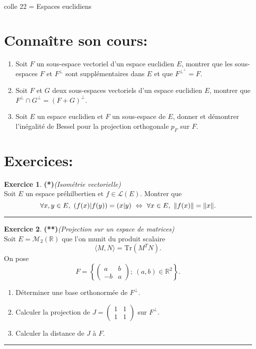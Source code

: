 \documentclass[a4paper,11pt]{article}
\theoremstyle{definition}
\newtheorem{exo}{Exercice} %
\begin{document}
	
	
	\begin{center}
		\Large \sc colle 22 = Espaces euclidiens
	\end{center}
\raggedright


\section*{Connaître son cours:}
\begin{enumerate}
\item Soit $F$ un sous-espace vectoriel d’un espace euclidien $E$, montrer que les sous-espaces $F$ et $F^\perp$ sont supplémentaires dans $E$ et que $F^{\perp^\perp} = F$.
\item Soit $F$ et $G$ deux sous-espaces vectoriels d’un espace euclidien $E$, montrer que $F^\perp  \cap G^\perp = (F + G)^\perp$.
\item Soit $E$ un espace euclidien et $F$ un sous-espace de $E$, donner et démontrer l'inégalité de Bessel pour la projection orthogonale $p_F$ sur $F$.
\end{enumerate}

\section*{Exercices:} 	

	
\begin{exo}\textbf{(*)}\quad\textit{(Isométrie vectorielle)}\\[0.25cm]

	Soit $E$ un espace préhilbertien et $f \in \mathcal{L}(E)$. Montrer que
	$$\forall x, y \in E, \ \left(f (x) | f (y)\right) = (x | y) \ \Leftrightarrow\ \forall x \in E, \ \|f (x)\| = \|x\|.$$
	\centering
	\rule{1\linewidth}{0.6pt}
\end{exo}

\begin{exo}\textbf{(**)}\quad \textit{(Projection sur un espace de matrices)} \\[0.25cm]
Soit $E=\mathcal M_2(\mathbb R)$ que l'on munit du produit scalaire
$$\langle M,N\rangle=\textrm{Tr}(M^TN).$$
On pose $$F=\left\{\begin{pmatrix}
a&b\\
-b&a
\end{pmatrix};\ (a,b)\in\mathbb R^2\right\}.$$
\begin{enumerate}
	\item Déterminer une base orthonormée de $F^\perp$.
	\item Calculer la projection de $J=\begin{pmatrix}1&1\\
	1&1
	\end{pmatrix}$
	sur $F^\perp$.
	\item Calculer la distance de $J$ à $F.$
\end{enumerate}
		
	\centering
	\rule{1\linewidth}{0.6pt}
\end{exo}
\end{document}
